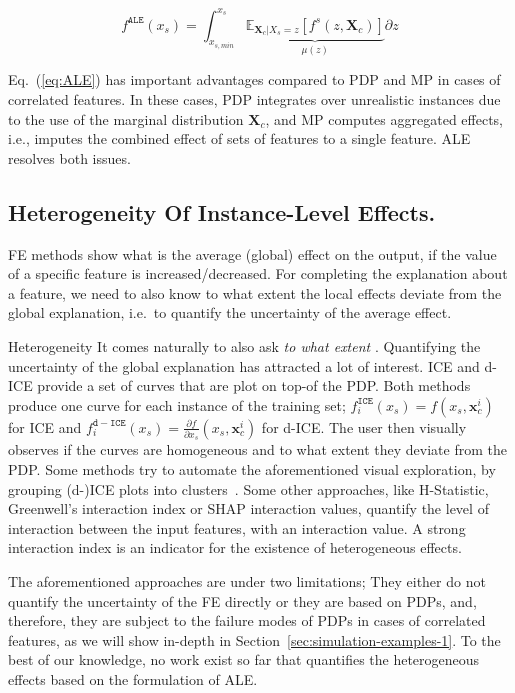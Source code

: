 \documentclass[twoside]{article}
\newcommand{\xc}{\mathbf{x}_c}
\newcommand{\Xcb}{\mathbf{X}_c}
\begin{document}
\begin{equation}
  \label{eq:ALE}
  f^{\mathtt{ALE}}(x_s) = \int_{x_{s,min}}^{x_s} \underbrace{\mathbb{E}_{\Xcb|X_s=z}\left [f^s (z, \Xcb)\right ]}_{\mu(z)} \partial z
\end{equation}

Eq.~(\ref{eq:ALE}) has important advantages compared to PDP and MP in
cases of correlated features. In these cases, PDP integrates over
unrealistic instances due to the use of the marginal distribution
\(\mathbf{X}_c \), and MP computes aggregated effects, i.e., imputes
the combined effect of sets of features to a single feature. ALE
resolves both issues.

\subsection{Heterogeneity Of Instance-Level Effects.}
\label{sec:quant-heter-effects}

FE methods show what is the average (global) effect on the output, if
the value of a specific feature is increased/decreased. For completing
the explanation about a feature, we need to also know to what extent
the local effects deviate from the global explanation, i.e.~to
quantify the uncertainty of the average effect.


Heterogeneity It comes naturally to also ask \textit{to
  what extent }. Quantifying the uncertainty of the global explanation
has attracted a lot of interest. ICE and
d-ICE\citep{goldstein2015peeking} provide a set of curves that are
plot on top-of the PDP. Both methods produce one curve for each
instance of the training set;
\(f^{\mathtt{ICE}}_i(x_s) = f(x_s, \xc^i)\) for ICE and
\(f^{\mathtt{d-ICE}}_i(x_s) = \frac{\partial f}{\partial x_s} (x_s,
\xc^i)\) for d-ICE. The user then visually observes if the curves are
homogeneous and to what extent they deviate from the PDP. Some methods
try to automate the aforementioned visual exploration, by grouping
(d-)ICE plots into clusters~\citep{molnar2020model,
  herbinger2022repid, britton2019vine}. Some other approaches, like
H-Statistic\citep{friedman2008predictive}, Greenwell's interaction
index\citep{greenwell2018simple} or SHAP interaction
values\citep{lundberg2018consistent}, quantify the level of
interaction between the input features, with an interaction value. A
strong interaction index is an indicator for the existence of
heterogeneous effects.

The aforementioned approaches are under two limitations; They either
do not quantify the uncertainty of the FE directly or they are based
on PDPs, and, therefore, they are subject to the failure modes of PDPs
in cases of correlated features\citep{baniecki2021fooling}, as we will
show in-depth in Section~\ref{sec:simulation-examples-1}. To the best
of our knowledge, no work exist so far that quantifies the
heterogeneous effects based on the formulation of ALE.
\end{document}
